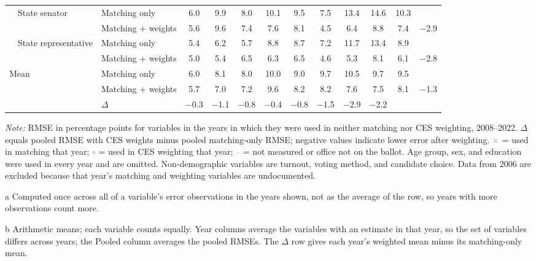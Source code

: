 \begin{table}[!htbp]
{\begin{threeparttable}
\begin{tabular}{llcccccccccc}
\addlinespace[0.1em]
~~State senator & Matching only & 6.0 & 9.9 & 8.0 & 10.1 & 9.5 & 7.5 & 13.4 & 14.6 & 10.3 & \\
 & Matching + weights & 5.6 & 9.6 & 7.4 & 7.6 & 8.1 & 4.5 & 6.4 & 8.8 & 7.4 & $-$2.9 \\
\addlinespace[0.1em]
~~State representative & Matching only & 5.4 & 6.2 & 5.7 & 8.8 & 8.7 & 7.2 & 11.7 & 13.4 & 8.9 & \\
 & Matching + weights & 5.0 & 5.4 & 6.5 & 6.3 & 6.5 & 4.6 & 5.3 & 8.1 & 6.1 & $-$2.8 \\
\midrule
Mean\tnote{b} & Matching only & 6.0 & 8.1 & 8.0 & 10.0 & 9.0 & 9.7 & 10.5 & 9.7 & 9.5 & \\
 & Matching + weights & 5.7 & 7.0 & 7.2 & 9.6 & 8.2 & 8.2 & 7.6 & 7.5 & 8.1 & $-$1.3 \\
 & $\Delta$ & $-$0.3 & $-$1.1 & $-$0.8 & $-$0.4 & $-$0.8 & $-$1.5 & $-$2.9 & $-$2.2 & & \\
\bottomrule
\end{tabular}
\begin{tablenotes}
\footnotesize
\item \textit{Note:} RMSE in percentage points for variables in the years in which they were used in neither matching nor CES weighting, 2008--2022. $\Delta$ equals pooled RMSE with CES weights minus pooled matching-only RMSE; negative values indicate lower error after weighting. \textcolor{gray}{$\times$} = used in matching that year; \textcolor{gray}{$\circ$} = used in CES weighting that year; \textcolor{gray}{--} = not measured or office not on the ballot. Age group, sex, and education were used in every year and are omitted. Non-demographic variables are turnout, voting method, and candidate choice. Data from 2006 are excluded because that year's matching and weighting variables are undocumented.
\item[a] Computed once across all of a variable's error observations in the years shown, not as the average of the row, so years with more observations count more.
\item[b] Arithmetic means; each variable counts equally. Year columns average the variables with an estimate in that year, so the set of variables differs across years; the Pooled column averages the pooled RMSEs. The $\Delta$ row gives each year's weighted mean minus its matching-only mean.
\end{tablenotes}
\end{threeparttable}%
}
\end{table}